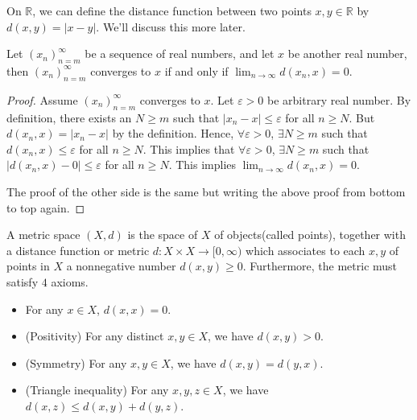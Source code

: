 On \(\mathbb{R} \), we can define the distance function between two points \(x,y \in \mathbb{R} \) by \(d(x,y) = \vert x-y \vert \). We'll discuss this more later. 
\begin{lemma}
    Let \((x_n)_{n=m}^{\infty} \) be a sequence of real numbers, and let \(x\) be another real number, then \((x_n)_{n=m}^{\infty} \) converges to \(x\) if and only if \(\lim_{n \to \infty} d(x_n, x) = 0 \).   
\end{lemma}  
\begin{proof}
    Assume \((x_n)_{n=m}^{\infty} \) converges to \(x\). Let \(\varepsilon > 0\) be arbitrary real number. By definition, there exists an \(N \ge m\) such that \(\vert x_n - x \vert \le \varepsilon  \) for all \(n \ge N\). But \(d(x_n, x) = \vert x_n - x \vert \) by the definition. Hence, \(\forall \varepsilon > 0\), \(\exists N \ge m\) such that \(d(x_n, x) \le \varepsilon \) for all \(n \ge N\). This implies that \(\forall \varepsilon > 0\), \(\exists N \ge m\) such that \(\left\vert d(x_n, x) - 0 \right\vert \le \varepsilon  \) for all \(n \ge N\). This implies \(\lim_{n \to \infty} d(x_n, x) = 0 \). 
    
    The proof of the other side is the same but writing the above proof from bottom to top again.
\end{proof}

\begin{definition}\label{dfn: metric space}
    A metric space \((X, d)\) is the space of \(X\) of objects(called points), together with a distance function or metric \(d: X \times X \to [0, \infty )\) which associates to each \(x, y\) of points in \(X\) a nonnegative number \(d(x,y) \ge 0\). Furthermore, the metric must satisfy \(4\) axioms. 
    \begin{itemize}
        \item [(a)] For any \(x \in X\), \(d(x,x) = 0\). 
        \item [(b)] (Positivity) For any distinct \(x, y \in X\), we have \(d(x,y) > 0\). 
        \item [(c)] (Symmetry) For any \(x,y \in X\), we have \(d(x,y) = d(y,x)\). 
        \item [(d)] (Triangle inequality) For any \(x,y,z \in X\), we have \(d(x,z) \le d(x,y) + d(y,z)\).         
    \end{itemize}       
\end{definition}

